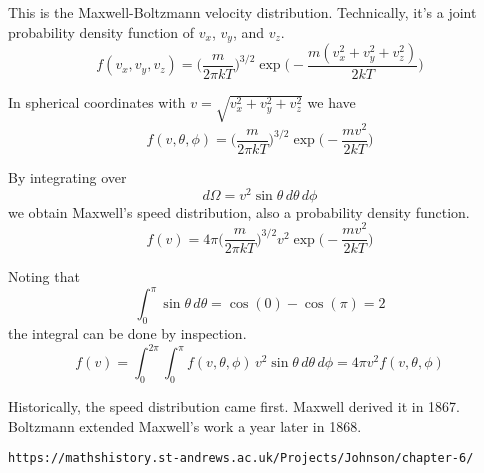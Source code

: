 \documentclass[12pt]{article}
\begin{document}
This is the Maxwell-Boltzmann velocity distribution.
Technically, it's a joint probability density function of $v_x$, $v_y$, and $v_z$.
\begin{equation*}
f(v_x,v_y,v_z)=
\bigg(\frac{m}{2\pi kT}\bigg)^{3/2}
\exp\bigg({-}\frac{m(v_x^2+v_y^2+v_z^2)}{2kT}\bigg)
\end{equation*}

In spherical coordinates with $v=\sqrt{v_x^2+v_y^2+v_z^2}$ we have
\begin{equation*}
f(v,\theta,\phi)=
\bigg(\frac{m}{2\pi kT}\bigg)^{3/2}
\exp\bigg({-}\frac{mv^2}{2kT}\bigg)
\end{equation*}

By integrating over
\begin{equation*}
d\Omega=v^2\sin\theta\,d\theta\,d\phi
\end{equation*}
we obtain Maxwell's speed distribution,
also a probability density function.
\begin{equation*}
f(v)=4\pi\bigg(\frac{m}{2\pi kT}\bigg)^{3/2}
v^2\exp\bigg({-}\frac{mv^2}{2kT}\bigg)
\end{equation*}

Noting that
\begin{equation*}
\int_0^\pi\sin\theta\,d\theta=\cos(0)-\cos(\pi)=2
\end{equation*}
the integral can be done by inspection.
\begin{equation*}
f(v)=\int_0^{2\pi}\int_0^\pi f(v,\theta,\phi)\,v^2\sin\theta\,d\theta\,d\phi
=4\pi v^2f(v,\theta,\phi)
\end{equation*}

Historically, the speed distribution came first.
Maxwell derived it in 1867.
Boltzmann extended Maxwell's work a year later in 1868.

\bigskip
{\footnotesize \verb$https://mathshistory.st-andrews.ac.uk/Projects/Johnson/chapter-6/$}
\end{document}
